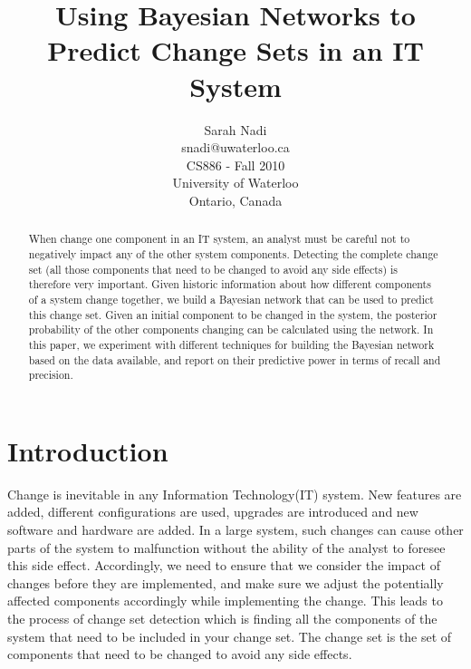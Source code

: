\documentclass[10pt,twocolumn,letterpaper]{article}
\begin{document}
 
\title{Using Bayesian Networks to Predict Change Sets in an IT System}

\author{Sarah Nadi\\snadi@uwaterloo.ca\\CS886 - Fall 2010\\University of Waterloo\\ Ontario, Canada}        
\thispagestyle{empty}
\maketitle


\begin{abstract} 
When change one component in an IT system, an analyst must be careful not to negatively impact any of the other system components. Detecting the complete
change set (all those components that need to be changed to avoid any side effects) is therefore very important. Given historic information about how different
components of a system change together, we build a Bayesian network that can be used to predict this change set. Given an initial component to be changed in
the system, the posterior probability of the other components changing can be calculated using the network. In this paper, we experiment with different
techniques for building the Bayesian network based on the data available, and report on their predictive power in terms of recall and precision.
\end{abstract} 



\section{Introduction}
\label{intro}

Change is inevitable in any Information Technology(IT) system. New features are added, different configurations are used, upgrades are introduced and new
software and hardware are added. In a large system, such changes can cause other parts of the system to malfunction without the ability of the analyst to
foresee this side effect. Accordingly, we need to ensure that we consider the impact of changes before they are implemented, and make sure we adjust the
potentially affected components accordingly while implementing the change. This leads to the process of change set detection which is finding all the
components of the system that need to be included in your change set. The change set is the set of components that need to be changed to avoid any side
effects. 
\end{document}
